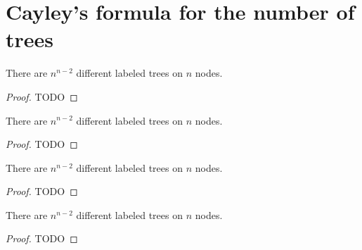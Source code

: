 \chapter{Cayley's formula for the number of trees}

\begin{theorem}
  \label{cayley_formala_proof1}
  There are $n^{n - 2}$ different labeled trees on $n$ nodes.
\end{theorem}
\begin{proof}
  TODO
\end{proof}


\begin{theorem}
  \label{cayley_formala_proof2}
  There are $n^{n - 2}$ different labeled trees on $n$ nodes.
\end{theorem}
\begin{proof}
  TODO
\end{proof}

\begin{theorem}
  \label{cayley_formala_proof2}
  There are $n^{n - 2}$ different labeled trees on $n$ nodes.
\end{theorem}
\begin{proof}
  TODO
\end{proof}


\begin{theorem}
  \label{cayley_formala_proof3}
  There are $n^{n - 2}$ different labeled trees on $n$ nodes.
\end{theorem}
\begin{proof}
  TODO
\end{proof}
